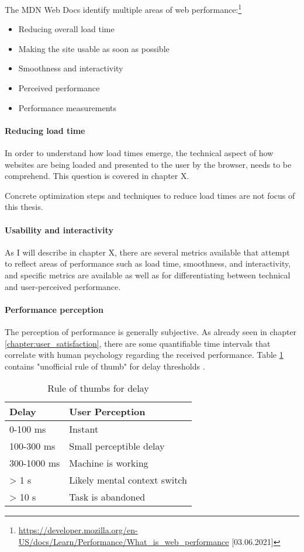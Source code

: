The MDN Web Docs identify multiple areas of web performance:\footnote{\url{https://developer.mozilla.org/en-US/docs/Learn/Performance/What_is_web_performance} [03.06.2021]}
\begin{itemize}
\item Reducing overall load time
\item Making the site usable as soon as possible
\item Smoothness and interactivity
\item Perceived performance
\item Performance measurements
\end{itemize}

\paragraph{Reducing load time}

In order to understand how load times emerge, the technical aspect of how websites are being loaded and presented to the user by the browser, needs to be comprehend.
This question is covered in chapter X.

Concrete optimization steps and techniques to reduce load times are not focus of this thesis.


\paragraph{Usability and interactivity}

As I will describe in chapter X, there are several metrics available that attempt to reflect areas of performance such as load time, smoothness, and interactivity, and specific metrics are available as well as for differentiating between technical and user-perceived performance.


\paragraph{Performance perception}

The perception of performance is generally subjective.
As already seen in chapter \ref{chapter:user_satisfaction}, there are some quantifiable time intervals that correlate with human psychology regarding the received performance.
Table \ref{table:perception} contains "unofficial rule of thumb" for delay thresholds \cite{2013Grigorik}.


\begin{table}[h]
	\centering
	\begin{tabular}{| l | l | }
	\hline
	Delay & User Perception \\
	\hline
	0-100 ms & Instant \\
	100-300 ms & Small perceptible delay \\
	300-1000 ms & Machine is working \\
	> 1 s & Likely mental context switch \\
	> 10 s & Task is abandoned \\
	\hline
	\end{tabular}
	\label{table:perception}
	\caption{Rule of thumbs for delay}
\end{table}

